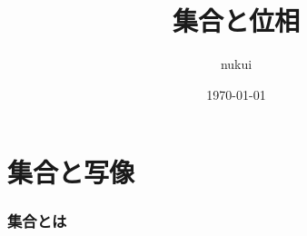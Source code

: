 \documentclass{jsarticle}
\begin{document}
\title{集合と位相}
\author{nukui}
\date{\today}
\maketitle
\setcounter{tocdepth}{1}
\tableofcontents

\newpage

\part{集合と写像}
\section{集合とは}


\end{document}
